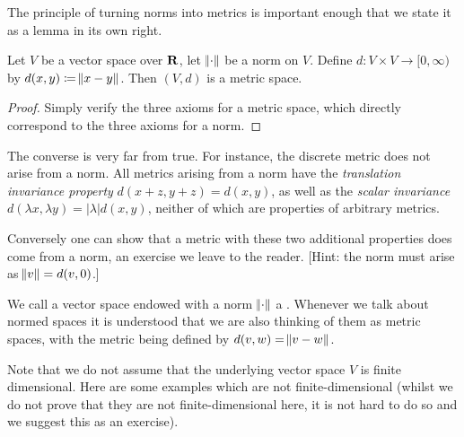 The principle of turning norms into metrics is important enough that we state it as a lemma in its own right.

\begin{lemma}
Let $V$ be a vector space over $\mathbf R$, let $\norm{\cdot}$ be a norm on $V$. Define $d:V\times V\to[0,\infty)$ by $d(x,y)\coloneqq\norm{x-y}$. Then $(V,d)$ is a metric space.
\end{lemma}

\begin{proof}
Simply verify the three axioms for a metric space, which directly correspond to the three axioms for a norm.
\end{proof}

\begin{remark}
The converse is very far from true. For instance, the discrete metric does not arise from a norm. All metrics arising from a norm have the \emph{translation invariance property} $d(x+z,y+z)=d(x,y)$, as well as the \emph{scalar invariance} $d(\lambda x,\lambda y)=|\lambda|d(x,y)$, neither of which are properties of arbitrary metrics.

Conversely one can show that a metric with these two additional properties does come from a norm, an exercise we leave to the reader. [Hint: the norm must arise as $\norm{v}=d(v,0)$.]
\end{remark}

We call a vector space endowed with a norm $\norm{\cdot}$ a . Whenever we talk about normed spaces it is understood that we are also thinking of them as metric spaces, with the metric being defined by $d(v,w)=\norm{v-w}$.

Note that we do not assume that the underlying vector space $V$ is finite dimensional. Here are some examples which are not finite-dimensional (whilst we do not prove that they are not finite-dimensional here, it is not hard to do so and we suggest this as an exercise).

